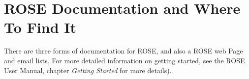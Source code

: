 
\section{ROSE Documentation and Where To Find It}


   There are three forms of documentation for ROSE, and also a ROSE web Page and email
lists. For more detailed information on getting started, see the ROSE User Manual, 
chapter {\em Getting Started} for more details).

